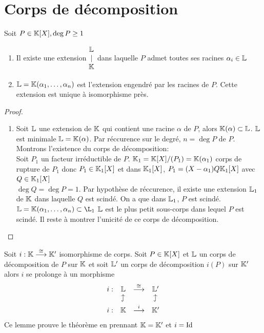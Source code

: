 \documentclass[]{report}
\begin{document}
    \section{Corps de décomposition}

    \begin{tm}{}{}
        Soit $P\in \mathbb{K}[X],\deg P\ge 1$
        \begin{enumerate}
            \item Il existe une extension $\begin{matrix}
                \mathbb{L}\\
                |\\
                \mathbb{K}
            \end{matrix}$ dans laquelle $P$ admet toutes ses racines $\alpha_i\in \mathbb{L}$
            \item $\mathbb{L}=\mathbb{K}(\alpha_1,\ldots,\alpha_n)$ est l'extension engendré par les racines de $P$. Cette extension est unique à isomorphisme près.
        \end{enumerate}
    \end{tm}

    \begin{proof}
        \begin{enumerate}
            \item Soit $\mathbb{L}$ une extension de $\mathbb{K}$ qui contient une racine $\alpha$ de $P$, alors $\mathbb{K}(\alpha)\subset\mathbb{L}$. $\mathbb{L}$ est minimale \ssi $\mathbb{L}=\mathbb{K}(\alpha)$. Par réccurence sur le degré, $n=\deg P$ de $P$. Montrons l'existence du corps de décomposition:\\
            Soit $P_1$ un facteur irréductible de $P$. $\mathbb{K}_1=\mathbb{K}[X]/(P_1)=\mathbb{K}(\alpha_1)$ corps de rupture de $P_1$ donc $P_1\in\mathbb{K}_1[X]$ et dans $\mathbb{K}_1[X]$, $P_1=(X-\alpha_1)Q\mathbb{K}_1[X]$ avec $Q\in\mathbb{K}_1[X]$\\
            $\deg Q=\deg P=1$. Par hypothèse de réccurence, il existe une extension $\mathbb{L}_1$ de $\mathbb{K}$ dans laquelle $Q$ est scindé. On a que dans $\mathbb{L}_1$, $P$ est scindé.\\
            $\La=\K(\alpha_1,\ldots,\alpha_n)\subset \L_1$ $\mathbb{L}$ est le plus petit sous-corps dans lequel $P$ est scindé. Il reste à montrer l'unicité de ce corps de décomposition.\\
        \end{enumerate}
    \end{proof}

    \begin{lm}{}{}
        Soit $i:\mathbb{K}\overset{\cong}{\longrightarrow}\mathbb{K}'$ isomorphisme de corps. Soit $P\in \mathbb{K}[X]$ et $\mathbb{L}$ un corps de décomposition de $P$ sur $\mathbb{K}$ et soit $\mathbb{L}'$ un corps de décomposition $i(P)$ sur $\mathbb{K}'$ alors $i$ se prolonge à un morphisme\\
        \[\begin{matrix}
            i:&\La&\overset{\cong}{\longrightarrow}&\La'\\
            &\text{\rotatebox{90}{$\hookrightarrow$}}&&\text{\rotatebox{90}{$\hookrightarrow$}}\\
            i:&\K&\overset{i}{\longrightarrow}&\K'
        \end{matrix}\]
        Ce lemme prouve le théorème en prennant $\mathbb{K}=\mathbb{K}'$ et $i=\text{Id}$
    \end{lm}
\end{document}
